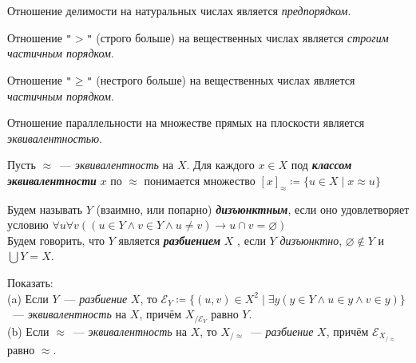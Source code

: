 \documentclass{article}
\begin{document}
    \begin{example}
        Отношение делимости на натуральных числах является \textit{предпорядком}.
    \end{example}

    \begin{example}
        Отношение \texttt{"$>$"} (строго больше) на вещественных числах является \textit{строгим частичным порядком}.
    \end{example}

    \begin{example}
        Отношение \texttt{"$\geqslant$"} (нестрого больше) на вещественных числах является    \textit{частичным порядком}.
    \end{example}


    \begin{example}
        Отношение параллельности на множестве прямых на плоскости является \textit{эквивалентностью}.
    \end{example}

    \begin{definition_boxed}
        Пусть $\approx$~--- \textit{эквивалентность} на $X$.
        Для каждого $x \in X$ под \textit{\textbf{классом эквивалентности}} $x$ по $\approx$ понимается множество
        $[x]_\approx \coloneqq \{u\in X \mid x\approx u\}$
    \end{definition_boxed}

    \begin{definition_boxed}
        Будем называть $Y$ (взаимно, или попарно) \textit{\textbf{дизъюнктным}}, если оно удовлетворяет условию $\forall u\forall v((u\in Y \wedge v\in Y \wedge u\neq v)\rightarrow u \cap v=\varnothing)$\\
%
        Будем говорить, что $Y$ является \textit{\textbf{разбиением}} $X$ , если $Y$ \textit{дизъюнктно}, $\varnothing \notin Y$ и $\bigcup Y = X$.
    \end{definition_boxed}


    \begin{task_boxed}
        Показать:\\
        (a) Если $Y$~--- \textit{разбиение} $X$, то
        $\mathscr{E}_Y \coloneqq \{(u,v)\in X^2 \mid \exists y(y\in Y \wedge u\in y\wedge v\in y)\}$~--- \textit{эквивалентность} на $X$, причём $X_{/\mathscr{E}_Y}$ равно $Y$.\\
        (b) Если $\approx$~--- \textit{эквивалентность} на $X$, то $X_{/\approx}$~--- \textit{разбиение} $X$, причём $\mathscr{E}_{X_{/\approx}}$ равно $\approx$.

    \end{task_boxed}
\end{document}
